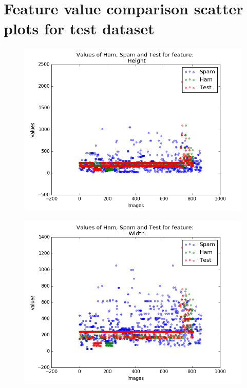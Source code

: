 \chapter{Feature value comparison scatter plots for test dataset\label{app:a}}



\begin{figure}[h]
	\centering
	\begin{minipage}{.5\textwidth}
		\centering
		\includegraphics[width=\linewidth]{images/appA/Height_values_scatter} 
		\label{fig:Height_values_scatter}
	\end{minipage}%
	\begin{minipage}{.5\textwidth}
		\centering
		\includegraphics[width=\linewidth]{images/appA/Width_values_scatter}
		\label{fig:Width_values_scatter}
		
	\end{minipage}
\end{figure}




